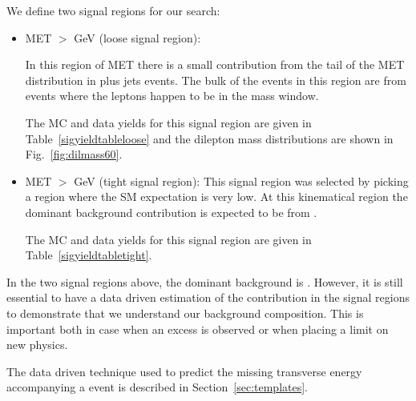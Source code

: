 We define two signal regions for our search:
\begin{itemize}
\item MET $>$ \signalmetl GeV (loose signal region):

In this region of MET there is a small contribution from the tail of the MET distribution 
in \Z plus jets events. 
The bulk of the events in this region are from \ttbar events where the leptons happen to be in the \Z 
mass window.


The MC and data yields for this signal region are given in Table~\ref{sigyieldtableloose} and the dilepton
mass distributions are shown in Fig.~\ref{fig:dilmass60}.



\item MET $>$ \signalmett GeV (tight signal region):
This signal region was selected by picking a region where the SM 
expectation is very low.
At this kinematical region the dominant background contribution is expected to be from \ttbar.

The MC and data yields for this signal region are given in Table~\ref{sigyieldtabletight}.
\end{itemize}

In the two signal regions above, the dominant background is \ttbar. 
However, it is still essential to have a data driven estimation of the \Z contribution
in the signal regions to demonstrate that we understand our background composition.
This is important both in case when an excess is observed or when placing a limit on new physics.

The data driven technique used to predict the missing transverse energy accompanying 
a \Z event is described in Section~\ref{sec:templates}.

